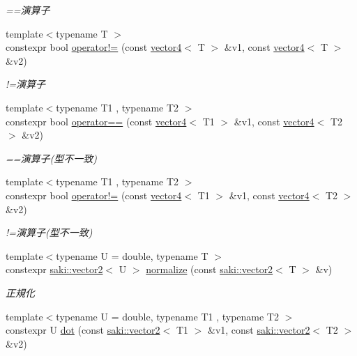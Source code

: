 \begin{DoxyCompactItemize}
\begin{DoxyCompactList}\small\item\em ==演算子 \end{DoxyCompactList}\item 
{\footnotesize template$<$typename T $>$ }\\constexpr bool \mbox{\hyperlink{namespacesaki_a6805502ef12cd12f6be61a958fd35aa7}{operator!=}} (const \mbox{\hyperlink{classsaki_1_1vector4}{vector4}}$<$ T $>$ \&v1, const \mbox{\hyperlink{classsaki_1_1vector4}{vector4}}$<$ T $>$ \&v2)
\begin{DoxyCompactList}\small\item\em !=演算子 \end{DoxyCompactList}\item 
{\footnotesize template$<$typename T1 , typename T2 $>$ }\\constexpr bool \mbox{\hyperlink{namespacesaki_af2a10e5e2974f482b6da75d9137dc143}{operator==}} (const \mbox{\hyperlink{classsaki_1_1vector4}{vector4}}$<$ T1 $>$ \&v1, const \mbox{\hyperlink{classsaki_1_1vector4}{vector4}}$<$ T2 $>$ \&v2)
\begin{DoxyCompactList}\small\item\em ==演算子(型不一致) \end{DoxyCompactList}\item 
{\footnotesize template$<$typename T1 , typename T2 $>$ }\\constexpr bool \mbox{\hyperlink{namespacesaki_abf6f98117a7a12898df59d2041040000}{operator!=}} (const \mbox{\hyperlink{classsaki_1_1vector4}{vector4}}$<$ T1 $>$ \&v1, const \mbox{\hyperlink{classsaki_1_1vector4}{vector4}}$<$ T2 $>$ \&v2)
\begin{DoxyCompactList}\small\item\em !=演算子(型不一致) \end{DoxyCompactList}\item 
{\footnotesize template$<$typename U  = double, typename T $>$ }\\constexpr \mbox{\hyperlink{classsaki_1_1vector2}{saki\+::vector2}}$<$ U $>$ \mbox{\hyperlink{namespacesaki_a0ca208fb45c585d9cd23276fb91e40ee}{normalize}} (const \mbox{\hyperlink{classsaki_1_1vector2}{saki\+::vector2}}$<$ T $>$ \&v)
\begin{DoxyCompactList}\small\item\em 正規化 \end{DoxyCompactList}\item 
{\footnotesize template$<$typename U  = double, typename T1 , typename T2 $>$ }\\constexpr U \mbox{\hyperlink{namespacesaki_a820a45ae402c8447bce4fee36a1f7d62}{dot}} (const \mbox{\hyperlink{classsaki_1_1vector2}{saki\+::vector2}}$<$ T1 $>$ \&v1, const \mbox{\hyperlink{classsaki_1_1vector2}{saki\+::vector2}}$<$ T2 $>$ \&v2)

\end{DoxyCompactItemize}
